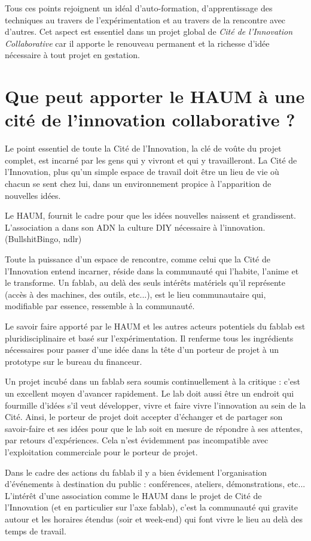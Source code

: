 \documentclass[a4paper,10pt]{scrartcl}
\begin{document}
Tous ces points rejoignent un idéal d'auto-formation, d'apprentissage des techniques au travers de l'expérimentation et au travers de la rencontre avec d'autres. Cet aspect est essentiel dans un projet global de \emph{Cité de l'Innovation Collaborative} car il apporte le renouveau permanent et la richesse d'idée nécessaire à tout projet en gestation.

\section{Que peut apporter le HAUM à une cité de l'innovation collaborative ?}

Le point essentiel de toute la Cité de l'Innovation, la clé de voûte du projet complet, est incarné par les gens qui y vivront et qui y travailleront.
La Cité de l'Innovation, plus qu'un simple espace de travail doit être un lieu de vie où chacun se sent chez lui, dans un environnement propice à l'apparition de nouvelles idées.

Le HAUM, fournit le cadre pour que les idées nouvelles naissent et grandissent. L'association a dans son ADN la culture DIY nécessaire à l'innovation. (BullshitBingo, ndlr)

Toute la puissance d'un espace de rencontre, comme celui que la Cité de l'Innovation entend incarner, réside dans la communauté qui l'habite, l'anime et le transforme. Un fablab, au delà des seuls intérêts matériels qu'il représente (accès à des machines, des outils, etc...), est le lieu communautaire qui, modifiable par essence, ressemble à la communauté.

Le savoir faire apporté par le HAUM et les autres acteurs potentiels du fablab est pluridisciplinaire et basé sur l'expérimentation. Il renferme tous les ingrédients nécessaires pour passer d'une idée dans la tête d'un porteur de projet à un prototype sur le bureau du financeur.

Un projet incubé dans un fablab sera soumis continuellement à la critique : c'est un excellent moyen d'avancer rapidement. Le lab doit aussi être un endroit qui fourmille d'idées s'il veut développer, vivre et faire vivre l'innovation au sein de la Cité. Ainsi, le porteur de projet doit accepter d'échanger et de partager son savoir-faire et ses idées pour que le lab soit en mesure de répondre à ses attentes, par retours d'expériences. Cela n'est évidemment pas incompatible avec l'exploitation commerciale pour le porteur de projet. 

Dans le cadre des actions du fablab il y a bien évidement l'organisation d’événements à destination du public : conférences, ateliers, démonstrations, etc... L'intérêt d'une association comme le HAUM dans le projet de Cité de l'Innovation (et en particulier sur l'axe fablab), c'est la communauté qui gravite autour et les horaires étendus (soir et week-end) qui font vivre le lieu au delà des temps de travail.
\end{document}
